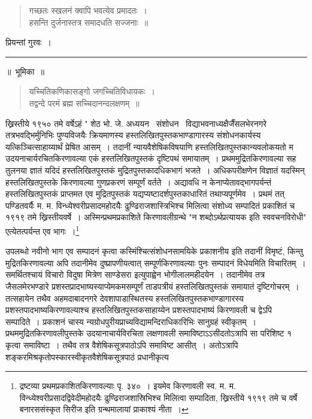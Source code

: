 \documentclass[11pt, openany]{book}
\begin{document}
\begin{quote}
{\qt गच्छतः स्खलनं क्वापि भवत्येव प्रमादतः~।\\
हसन्ति दुर्जनास्तत्र समादधति सज्जनाः~॥}
\end{quote}

प्रियन्तां गुरवः~।

\begin{center}
\rule{0.2\linewidth}{0.5pt}
\end{center}

\newpage
\thispagestyle{empty}
\begin{center}
{\Large ॥~भूमिका~॥}
\end{center}

\begin{quote}
{\qt यच्चितिकणिकासङ्गो जगच्चितिविधायकः~।\\
तद्वन्दे परमं ब्रह्म सच्चिदानन्दलक्षणम्~॥}
\end{quote}

ख्रिस्तीये १९५० तमे वर्षेऽहं " शेठ भो. जे. अध्ययन  \textendash\ संशोधन \textendash\ विद्याभवनाध्यक्षैर्जैंसलभेरनगरे तत्रभवद्भिर्मुनिभिः पुण्यविजयैः क्रियमाणस्य हस्तलिखितपुस्तकभाण्डागारस्य संशोधनकार्यस्य यत्किञ्चित्साहाय्यार्थं प्रेषित आसम्~। तदानीं न्यायवैशेषिकविषयाणि हस्तलिखितपुस्तकान्यवलोकयतो म {\knu उदयनाचार्यरचितकिरणावल्या} एकं हस्तलिखितपुस्तकं दृष्टिपथं समायातम्~। प्रथममुद्रितकिरणावल्या सह तुलनया ज्ञातं यदिदं हस्तलिखितपुस्तकं मुद्रितपुस्तकादधिकभागं भजते~। अधिकपरीक्षणेन विज्ञातं यदस्मिन् हस्तलिखितपुस्तके किरणावल्या गुणप्रकरणं सम्पूर्णं वर्तते~। अद्यावधि न केनाप्येतावद्भागपर्यन्तं हस्तलिखितपुस्तकं प्राप्तमत एव मुद्रितपुस्तकं यद्यप्यष्टादर्शपुस्तकाधारितं तथाप्यपूर्णमेव~। प्रथमं तत् पण्डितवर्यैः {\knu म. म. विन्ध्येश्वरीप्रसादमहोदयैः ढुण्ढिराजशास्त्रिभिश्च} मिलित्वा संशोध्य सम्पादितं प्रकाशितं च १९१९ तमे ख्रिस्तीयवर्षे~। अस्मिन्प्रथमप्रकाशिते किरणावलीग्रन्थे {\knu "न शब्दोऽर्थप्रत्यायक इति स्ववचनविरोधी"} एत्येतत्पर्यन्त एव भागः~।\renewcommand{\thefootnote}{१}\footnote{द्रष्टव्या प्रथमप्रकाशितकिरणावल्याः पृ. ३४०~। इयमेव किरणावली स्व. म. म. विन्ध्येश्वरीप्रसादद्विवेदीमहोदयैः ढुण्ढिराजशास्रिभिश्च मिलित्वा सम्पादिता, ख्रिस्तीये १९१९ तमे च वर्षे बनारससंस्कृत सिरीज इति ग्रन्थमालायां प्राकाश्यं नीता~।}

उपलब्धो नवीनो भाग एव सम्पादनं कृत्वा कस्मिंश्चित्संशोधनसामयिके प्रकाशनीय इति तदानीं विमृष्टं, किन्तु मुद्रितकिरणावल्या अपि तदानीमेव दुष्प्रापणीयत्वात् सम्पूर्णकिरणावल्याः पुनः सम्पादनं विधेयमिति विचारितम्~। समर्थितश्चायं विचारो विदुषा मित्रेण {\knu साण्डेसरा} इत्युपाह्वेन {\knu भोगीलालमहीदयेन}~। तदानीमेव तत्र जैसलमेरभण्डारे {\knu प्रशस्तप्रादभाष्यस्या}प्येमकमसम्पूर्णं ताडपत्रीयं हस्तलिखितपुस्तकं समायातं दृष्टिगोचरम्~। तत्सहायेन तथैव अहमदाबादनगरे देवशापाडास्थितस्य हस्तलिखितपुस्तकभाण्डागारस्य प्रशस्तपादभाष्यकिरणावल्याश्च हस्तलिखितपुस्तकसाहाय्येन प्रशस्तपादभाष्यं किरणावली च द्वेऽपि सम्पादिते~। प्रकाशनं चास्य न्यग्रोधपुरीयप्राच्यविद्यामन्दिराधिकारिभिः सानुग्रहं स्वीकृतम्~। प्रथममुद्रितकिरणावलीपुस्तके {\knu उदयानाचार्य}विरचिता लक्षणावली समाविष्टाऽऽसीदतोऽत्रापि सा परिशिष्ट १ कृत्वा समाविष्टा~। तथैव तत्र वैशेषिकसूत्रपाठोऽपि समाविष्ट आसीत्~। अतोऽत्रापि शङ्करमिश्रकृतोपस्कारस्वीकृतवैशेषिकसूत्रपाठं प्रधानीकृत्य
\end{document}
